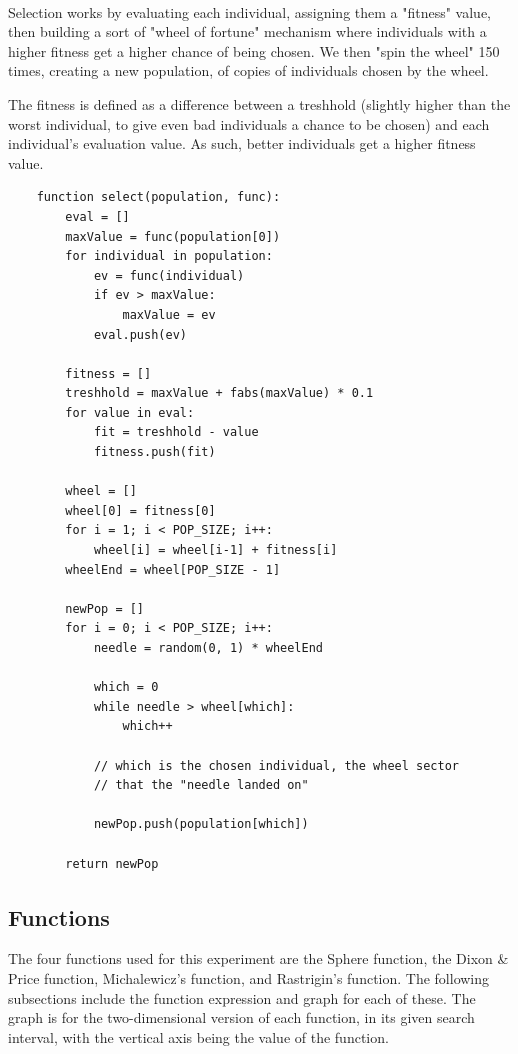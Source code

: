 \documentclass{article}
\begin{document}
    \paragraph{}
    Selection works by evaluating each individual, assigning them a "fitness" value, then building a sort of "wheel of fortune" mechanism where individuals with a higher fitness get a higher chance of being chosen. We then "spin the wheel" 150 times, creating a new population, of copies of individuals chosen by the wheel.

    The fitness is defined as a difference between a treshhold (slightly higher than the worst individual, to give even bad individuals a chance to be chosen) and each individual's evaluation value. As such, better individuals get a higher fitness value.

    \begin{verbatim}
    function select(population, func):
        eval = []
        maxValue = func(population[0])
        for individual in population:
            ev = func(individual)
            if ev > maxValue:
                maxValue = ev
            eval.push(ev)

        fitness = []
        treshhold = maxValue + fabs(maxValue) * 0.1
        for value in eval:
            fit = treshhold - value
            fitness.push(fit)
        
        wheel = []
        wheel[0] = fitness[0]
        for i = 1; i < POP_SIZE; i++:
            wheel[i] = wheel[i-1] + fitness[i]
        wheelEnd = wheel[POP_SIZE - 1]

        newPop = []
        for i = 0; i < POP_SIZE; i++:
            needle = random(0, 1) * wheelEnd
            
            which = 0
            while needle > wheel[which]:
                which++

            // which is the chosen individual, the wheel sector
            // that the "needle landed on"

            newPop.push(population[which])

        return newPop
    \end{verbatim}

	\subsection{Functions}
	The four functions used for this experiment are the Sphere function, the Dixon \& Price function, Michalewicz's function, and Rastrigin's function. The following subsections include the function expression and graph for each of these. The graph is for the two-dimensional version of each function, in its given search interval, with the vertical axis being the value of the function.
\end{document}
